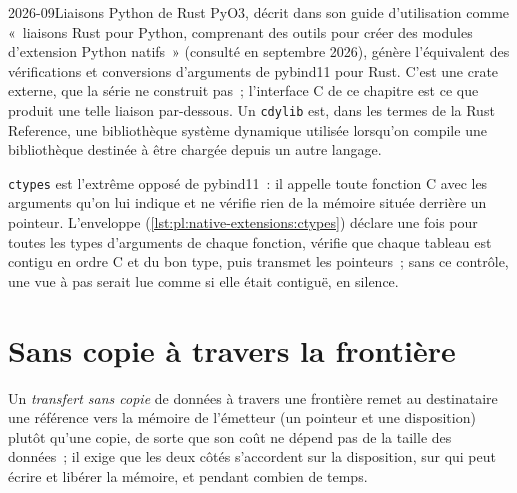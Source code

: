 \label{lst:pl:native-extensions:rust}

\begin{dated}{2026-09}{Liaisons Python de Rust}\label{dat:pl:native-extensions:pyo3}
PyO3, décrit dans son guide d'utilisation comme «~liaisons Rust pour Python, comprenant des outils pour créer des modules d'extension Python natifs~»
(consulté en septembre 2026), génère l'équivalent des vérifications et conversions d'arguments de pybind11 pour Rust. C'est une crate externe,
que la série ne construit pas~; l'interface C de ce chapitre est ce que produit une telle liaison par-dessous. Un \texttt{cdylib} est, dans
les termes de la Rust Reference, une bibliothèque système dynamique utilisée lorsqu'on compile une bibliothèque destinée à être chargée depuis un autre langage.
\end{dated}

\texttt{ctypes} est l'extrême opposé de pybind11~: il appelle toute fonction C avec les arguments qu'on lui indique et ne vérifie
rien de la mémoire située derrière un pointeur. L'enveloppe (\cref{lst:pl:native-extensions:ctypes}) déclare une fois pour toutes les types d'arguments de chaque fonction,
vérifie que chaque tableau est contigu en ordre C et du bon type, puis transmet les pointeurs~; sans ce contrôle, une vue à pas serait lue
comme si elle était contiguë, en silence.

\label{lst:pl:native-extensions:ctypes}

\section{Sans copie à travers la frontière}

\begin{definition}\label{def:pl:native-extensions:zerocopy}
Un \emph{transfert sans copie} de données à travers une frontière remet au destinataire une référence vers la mémoire de l'émetteur
(un pointeur et une disposition) plutôt qu'une copie, de sorte que son coût ne dépend pas de la taille des données~; il exige que les deux côtés s'accordent
sur la disposition, sur qui peut écrire et libérer la mémoire, et pendant combien de temps.
\end{definition}

